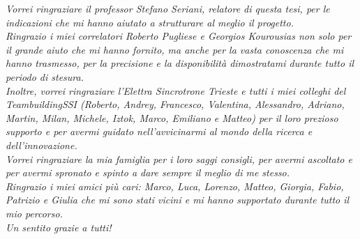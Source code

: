 \textit{
Vorrei ringraziare il professor Stefano Seriani, relatore di questa tesi, per le indicazioni che mi hanno aiutato a strutturare al meglio il progetto.\\
Ringrazio i miei correlatori Roberto Pugliese e Georgios Kourousias non solo per il grande
aiuto che mi hanno fornito, ma anche per la vasta conoscenza che mi hanno trasmesso, per la
precisione e la disponibilità dimostratami durante tutto il periodo di stesura.\\
Inoltre, vorrei ringraziare l'Elettra Sincrotrone Trieste e tutti i miei colleghi del TeambuildingSSI (Roberto, Andrey, Francesco, Valentina, Alessandro, Adriano, Martin, Milan, Michele, Iztok, Marco, Emiliano e Matteo)  per il loro prezioso supporto e per avermi guidato nell'avvicinarmi al mondo della ricerca e dell'innovazione.\\
Vorrei ringraziare la mia famiglia per i loro saggi consigli, per avermi ascoltato e per avermi spronato e spinto a dare sempre il meglio di me stesso.\\
Ringrazio i miei amici più cari: Marco, Luca, Lorenzo, Matteo, Giorgia, Fabio, Patrizio e Giulia che mi sono stati vicini e mi hanno supportato durante tutto il mio percorso.\\
Un sentito grazie a tutti!
}